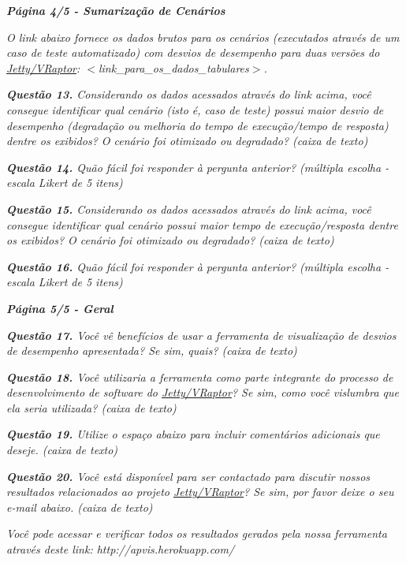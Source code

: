 \begin{framed}
	\noindent \textit{\textbf{Página 4/5 - Sumarização de Cenários}}
	\par
	\noindent \textit{O link abaixo fornece os dados brutos para os cenários (executados através de um caso de teste automatizado) com desvios de desempenho para duas versões do \underline{Jetty/VRaptor}: {\(<\)}link\_para\_os\_dados\_tabulares{\(>\)}.}
	\par
	\noindent \textit{\textbf{Questão 13.} Considerando os dados acessados através do link acima, você consegue identificar qual cenário (isto é, caso de teste) possui maior desvio de desempenho (degradação ou melhoria do tempo de execução/tempo de resposta) dentre os exibidos? O cenário foi otimizado ou degradado? (caixa de texto)}
	\par
	\noindent \textit{\textbf{Questão 14.} Quão fácil foi responder à pergunta anterior? (múltipla escolha - escala Likert de 5 itens)}
	\par
	\noindent \textit{\textbf{Questão 15.} Considerando os dados acessados através do link acima, você consegue identificar qual cenário possui maior tempo de execução/resposta dentre os exibidos? O cenário foi otimizado ou degradado? (caixa de texto)}
	\par
	\noindent \textit{\textbf{Questão 16.} Quão fácil foi responder à pergunta anterior? (múltipla escolha - escala Likert de 5 itens)}
\end{framed}

\begin{framed}
	\noindent \textit{\textbf{Página 5/5 - Geral}}
	\par
	\noindent \textit{\textbf{Questão 17.} Você vê benefícios de usar a ferramenta de visualização de desvios de desempenho apresentada? Se sim, quais? (caixa de texto)}
	\par
	\noindent \textit{\textbf{Questão 18.} Você utilizaria a ferramenta como parte integrante do processo de desenvolvimento de software do \underline{Jetty/VRaptor}? Se sim, como você vislumbra que ela seria utilizada? (caixa de texto)}
	\par
	\noindent \textit{\textbf{Questão 19.} Utilize o espaço abaixo para incluir comentários adicionais que deseje. (caixa de texto)}
	\par
	\noindent \textit{\textbf{Questão 20.} Você está disponível para ser contactado para discutir nossos resultados relacionados ao projeto \underline{Jetty/VRaptor}? Se sim, por favor deixe o seu e-mail abaixo. (caixa de texto)}

	\noindent \textit{Você pode acessar e verificar todos os resultados gerados pela nossa ferramenta através deste link: http://apvis.herokuapp.com/}
\end{framed}

